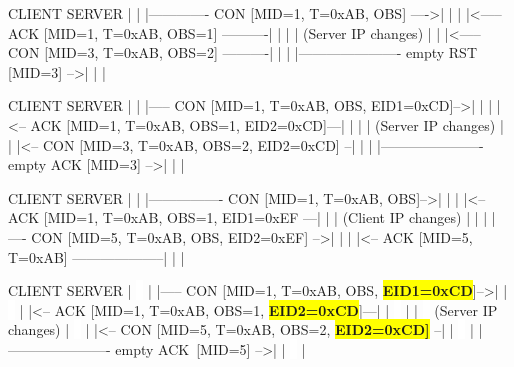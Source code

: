 
\begin{myverbbox}{\observewithouteid}
CLIENT                                       SERVER
  |                                            |
  |------------- CON [MID=1, T=0xAB, OBS] ---->|
  |                                            |
  |<----- ACK [MID=1, T=0xAB, OBS=1] ----------|
  |                                            |
  |                             (Server IP changes)
  |                                            |
  |<----- CON [MID=3, T=0xAB, OBS=2] ----------|
  |                                            |
  |---------------------- empty RST [MID=3] -->|
  |                                            |
\end{myverbbox}


\begin{myverbbox}{\observewitheid}
CLIENT                                       SERVER
  |                                            |
  |----- CON [MID=1, T=0xAB, OBS, EID1=0xCD]-->|
  |                                            |
  |<-- ACK [MID=1, T=0xAB, OBS=1, EID2=0xCD]---|
  |                                            |
  |                                    (Server IP changes)
  |                                            |
  |<-- CON [MID=3, T=0xAB, OBS=2, EID2=0xCD] --|
  |                                            |
  |---------------------- empty ACK [MID=3] -->|
  |                                            |
\end{myverbbox}


\begin{myverbbox}{\eidforclient}
   CLIENT                                       SERVER
      |                                            |
      |---------------- CON [MID=1, T=0xAB, OBS]-->|
      |                                            |
      |<-- ACK [MID=1, T=0xAB, OBS=1, EID1=0xEF ---|
      |                                            |
(Client IP changes)                                |
      |                                            |
      |---- CON [MID=5, T=0xAB, OBS, EID2=0xEF] -->|
      |                                            |
      |<-- ACK [MID=5, T=0xAB] --------------------|
      |                                            |
\end{myverbbox}


\begin{myverbbox}{\server}
   CLIENT                                       SERVER
    | \colorbox{white}{\ }                                          |
    |----- CON [MID=1, T=0xAB, OBS, \colorbox{yellow}{\textbf{EID1=0xCD}}]-->|
    | \colorbox{white}{\ }                                          |
    |<-- ACK [MID=1, T=0xAB, OBS=1, \colorbox{yellow}{\textbf{EID2=0xCD}}]---|
    | \colorbox{white}{\ }                                          |
    | \colorbox{white}{\ }                                (Server IP changes)
    | \colorbox{white}{\ }                                          |
    |<-- CON [MID=5, T=0xAB, OBS=2, \colorbox{yellow}{\textbf{EID2=0xCD]}} --|
    | \colorbox{white}{\ }                                          |
    |---------------------- empty ACK\colorbox{white}{\ }[MID=5] -->|
    | \colorbox{white}{\ }                                          |
\end{myverbbox}
